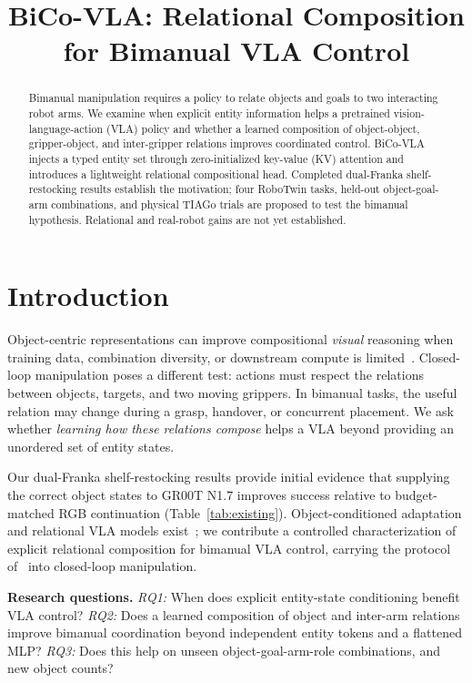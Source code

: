 \documentclass[letterpaper,10pt,conference]{ieeeconf}
\title{BiCo-VLA: Relational Composition for Bimanual VLA Control}
\author{}
\begin{document}
\maketitle

\begin{abstract}
Bimanual manipulation requires a policy to relate objects and goals to two interacting robot arms. We examine when explicit entity information helps a pretrained vision-language-action (VLA) policy and whether a learned composition of object-object, gripper-object, and inter-gripper relations improves coordinated control. BiCo-VLA injects a typed entity set through zero-initialized key-value (KV) attention and introduces a lightweight relational compositional head. Completed dual-Franka shelf-restocking results establish the motivation; four RoboTwin tasks, held-out object-goal-arm combinations, and physical TIAGo trials are proposed to test the bimanual hypothesis. Relational and real-robot gains are not yet established.
\end{abstract}

\section{Introduction}
\label{sec:intro}

Object-centric representations can improve compositional \emph{visual} reasoning when training data, combination diversity, or downstream compute is limited~\cite{kapl2026}. Closed-loop manipulation poses a different test: actions must respect the relations between objects, targets, and two moving grippers. In bimanual tasks, the useful relation may change during a grasp, handover, or concurrent placement. We ask whether \emph{learning how these relations compose} helps a VLA beyond providing an unordered set of entity states.

Our dual-Franka shelf-restocking results provide initial evidence that supplying the correct object states to GR00T N1.7 improves success relative to budget-matched RGB continuation (Table~\ref{tab:existing}). Object-conditioned adaptation and relational VLA models exist~\cite{li2025controlvla,zhou2026trirel}; we contribute a controlled characterization of explicit relational composition for bimanual VLA control, carrying the protocol of~\cite{kapl2026} into closed-loop manipulation.

\textbf{Research questions.}
\emph{RQ1:} When does explicit entity-state conditioning benefit VLA control?
\emph{RQ2:} Does a learned composition of object and inter-arm relations improve bimanual coordination beyond independent entity tokens and a flattened MLP?
\emph{RQ3:} Does this help on unseen object-goal-arm-role combinations, and new object counts?
\end{document}
